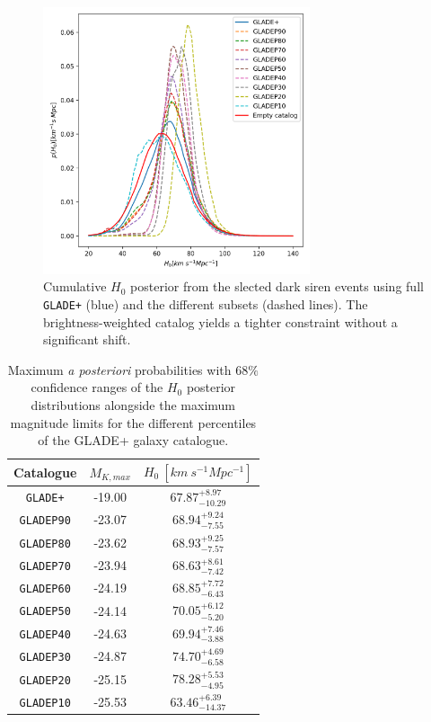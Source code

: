\begin{figure}[ht]
    \centering
    \includegraphics[width=0.7\textwidth]{figures/percentile_full_dict.png}
    \caption[Cumulative $H_0$ posterior from the slected dark siren events using full \texttt{GLADE+} and the different subsets.]{Cumulative $H_0$ posterior from the slected dark siren events using full \texttt{GLADE+} (blue) and the different subsets (dashed lines). The brightness-weighted catalog yields a tighter constraint without a significant shift.}
    \label{fig:h0_cumulative}
\end{figure}

\begin{table}
    \centering
    \caption[$H_0$ MAP values with $68\%$ confidence ranges, alongside the maximum magnitude limits for \texttt{GLADE+} and the different subsets.]{Maximum {\em a posteriori} probabilities with $68\%$ confidence ranges of the $H_0$ posterior distributions alongside the maximum magnitude limits for the different percentiles of the GLADE+ galaxy catalogue.}
    \begin{tabular}{c c c }
    \hline
        \textbf{Catalogue} & \textbf{$M_{K, max}$} & \textbf{$H_0~[km~s^{-1}Mpc^{-1}]$} \\ \hline
        \texttt{GLADE+} & -19.00 & $67.87^{+8.97}_{-10.29}$ \\
        \texttt{GLADEP90} & -23.07 & $68.94^{+9.24}_{-7.55}$ \\
        \texttt{GLADEP80} & -23.62 & $68.93^{+9.25}_{-7.57}$ \\
        \texttt{GLADEP70} & -23.94 & $68.63^{+8.61}_{-7.42}$ \\
        \texttt{GLADEP60} & -24.19 & $68.85^{+7.72}_{-6.43}$ \\
        \texttt{GLADEP50} & -24.14  & $70.05^{+6.12}_{-5.20}$ \\
        \texttt{GLADEP40} & -24.63 & $69.94^{+7.46}_{-3.88}$ \\
        \texttt{GLADEP30} & -24.87 & $74.70^{+4.69}_{-6.58}$ \\
        \texttt{GLADEP20} & -25.15 & $78.28^{+5.53}_{-4.95}$ \\
        \texttt{GLADEP10} & -25.53 & $63.46^{+6.39}_{-14.37}$ \\ \hline
    \end{tabular}
    \label{tab:h0_stats}
\end{table}

